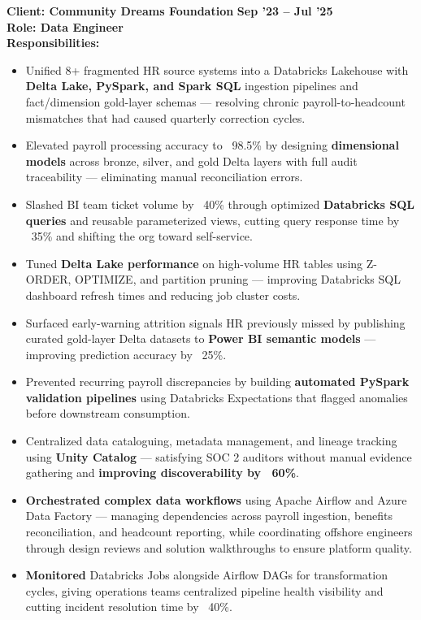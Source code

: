 \documentclass[a4paper,10pt]{article}
\begin{document}
\vspace{0.5cm}
\textbf{Client: Community Dreams Foundation} \hfill \textbf{Sep '23 – Jul '25} \\
\textbf{Role: Data Engineer} \\
\textbf{Responsibilities:}
\begin{itemize}
    \item Unified 8+ fragmented HR source systems into a Databricks Lakehouse with \textbf{Delta Lake, PySpark, and Spark SQL} ingestion pipelines and fact/dimension gold-layer schemas — resolving chronic payroll-to-headcount mismatches that had caused quarterly correction cycles.
    \item Elevated payroll processing accuracy to ~98.5\% by designing \textbf{dimensional models} across bronze, silver, and gold Delta layers with full audit traceability — eliminating manual reconciliation errors.
    \item Slashed BI team ticket volume by ~40\% through optimized \textbf{Databricks SQL queries} and reusable parameterized views, cutting query response time by ~35\% and shifting the org toward self-service.
    \item Tuned \textbf{Delta Lake performance} on high-volume HR tables using Z-ORDER, OPTIMIZE, and partition pruning — improving Databricks SQL dashboard refresh times and reducing job cluster costs.
    \item Surfaced early-warning attrition signals HR previously missed by publishing curated gold-layer Delta datasets to \textbf{Power BI semantic models} — improving prediction accuracy by ~25\%.
    \item Prevented recurring payroll discrepancies by building \textbf{automated PySpark validation pipelines} using Databricks Expectations that flagged anomalies before downstream consumption.
    \item Centralized data cataloguing, metadata management, and lineage tracking using \textbf{Unity Catalog} — satisfying SOC 2 auditors without manual evidence gathering and \textbf{improving discoverability by ~60\%}.
    \item \textbf{Orchestrated complex data workflows} using Apache Airflow and Azure Data Factory — managing dependencies across payroll ingestion, benefits reconciliation, and headcount reporting, while coordinating offshore engineers through design reviews and solution walkthroughs to ensure platform quality.
    \item \textbf{Monitored} Databricks Jobs alongside Airflow DAGs for transformation cycles, giving operations teams centralized pipeline health visibility and cutting incident resolution time by ~40\%.

\end{itemize}
\end{document}
